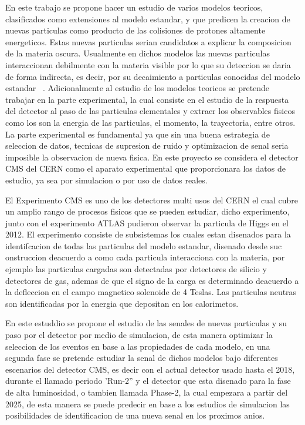 En este trabajo se propone hacer un estudio de varios modelos teoricos, clasificados como extensiones al modelo estandar, y que predicen la creacion de nuevas particulas como producto de las colisiones de protones altamente energeticos. Estas nuevas particulas serian candidatos a explicar la composicion de la materia oscura.  Usualmente en dichos modelos las nuevas particulas interaccionan debilmente con la materia visible por lo que su deteccion se daria de forma indirecta, es decir, por su decaimiento a particulas conocidas del modelo estandar~\cite{Curtin2015} .  Adicionalmente al estudio de los modelos teoricos se pretende trabajar en la parte experimental, la cual consiste en el estudio de la respuesta del detector al paso de las particulas elementales y extraer los observables fisicos como los son la energia de las particulas, el momento, la trayectoria, entre otros.  La parte experimental es fundamental ya que sin una buena estrategia de seleccion de datos, tecnicas de supresion de ruido y optimizacion de senal seria imposible la observacion de nueva fisica. En este proyecto se considera el detector CMS del CERN como el aparato experimental que proporcionara los datos de estudio, ya sea por simulacion o por uso de datos reales.  

El Experimento CMS es uno de los detectores multi usos del CERN el cual cubre un amplio rango de procesos fisicos que se pueden estudiar, dicho experimento, junto con el experimento ATLAS pudieron observar la particula de Higgs en el 2012.  El experimento consiste de subsistemas los cuales estan disenados para la identifcacion de todas las particulas del modelo estandar, disenado desde suc onstruccion deacuerdo a como cada particula interacciona con la materia, por ejemplo las particulas cargadas son detectadas por detectores de silicio y detectores de gas, ademas de que el signo de la carga es determinado deacuerdo a la defleccion en el campo magnetico solenoide de 4 Teslas.  Las particulas neutras son identificadas por la energia que depositan en los calorimetos.   

En este estuddio se propone el estudio de las senales de nuevas particulas y su paso por el detector por medio de simulacion, de esta manera optimizar la seleccion de los eventos en base a las propiedades de cada modelo, en una segunda fase se pretende estudiar la senal de dichos modelos bajo diferentes escenarios del detector CMS, es decir con el actual detector usado hasta el 2018, durante el llamado periodo 'Run-2'' y el detector que esta disenado para la fase de alta luminosidad, o tambien llamada Phase-2, la cual empezara  a partir del 2025, de esta manera se puede predecir en base a los estudios de simulacion las posibilidades de identificacion de una nueva senal en los proximos anios. 


